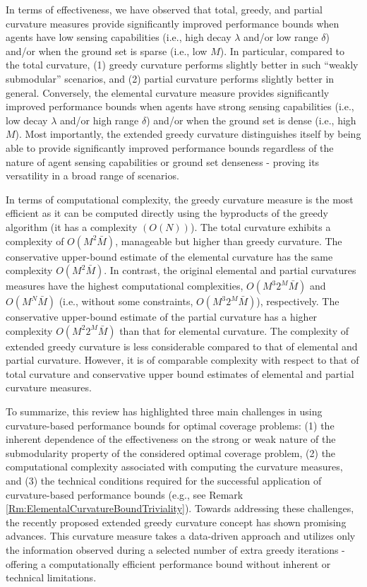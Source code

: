 \documentclass[letterpaper, 10 pt, conference]{ieeeconf}
\begin{document}
In terms of effectiveness, we have observed that total, greedy, and partial curvature measures provide significantly improved performance bounds when agents have low sensing capabilities (i.e., high decay $\lambda$ and/or low range $\delta$) and/or when the ground set is sparse (i.e., low $M$). In particular, compared to the total curvature, (1) greedy curvature performs slightly better in such ``weakly submodular'' scenarios, and (2) partial curvature performs slightly better in general. 
Conversely, the elemental curvature measure provides significantly improved performance bounds when agents have strong sensing capabilities (i.e., low decay $\lambda$ and/or high range $\delta$) and/or when the ground set is dense (i.e., high $M$). Most importantly, the extended greedy curvature distinguishes itself by being able to provide significantly improved performance bounds regardless of the nature of agent sensing capabilities or ground set denseness - proving its versatility in a broad range of scenarios.


In terms of computational complexity, the greedy curvature measure is the most efficient as it can be computed directly using the byproducts of the greedy algorithm (it has a complexity $(O(N))$).
The total curvature exhibits a complexity of \(O(M^2\bar{M})\), manageable but higher than greedy curvature. The conservative upper-bound estimate of the elemental curvature has the same complexity $O(M^2\bar{M})$. In contrast, the original elemental and partial curvatures measures have the highest computational complexities, $O(M^3 2^M \bar{M})$ and $O(M^N\bar{M})$ (i.e., without some constraints, $O(M^3 2^M \bar{M})$), respectively. The conservative upper-bound estimate of the partial curvature has a higher complexity \(O(M^2 2^M \bar{M})\) than that for elemental curvature. The complexity of extended greedy curvature is less considerable compared to that of elemental and partial curvature. However, it is of comparable complexity with respect to that of total curvature and conservative upper bound estimates of elemental and partial curvature measures. 


To summarize, this review has highlighted three main challenges in using curvature-based performance bounds for optimal coverage problems: 
(1) the inherent dependence of the effectiveness on the strong or weak nature of the submodularity property of the considered optimal coverage problem,  
(2) the computational complexity associated with computing the curvature measures, and 
(3) the technical conditions required for the successful application of curvature-based performance bounds (e.g., see Remark \ref{Rm:ElementalCurvatureBoundTriviality}). Towards addressing these challenges, the recently proposed extended greedy curvature concept \cite{WelikalaJ02021} has shown promising advances. This curvature measure takes a data-driven approach and utilizes only the information observed during a selected number of extra greedy iterations - offering a computationally efficient performance bound without inherent or technical limitations. 
\end{document}
